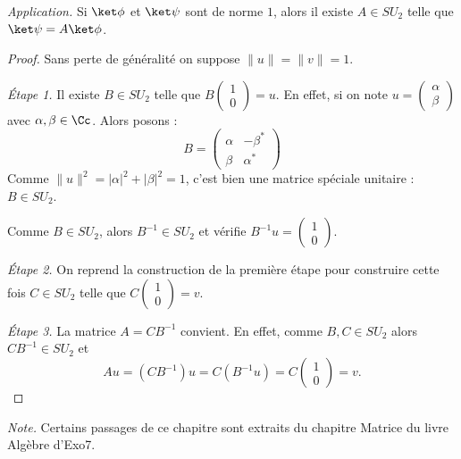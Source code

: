 \documentclass[11pt,class=report,crop=false]{standalone}
\begin{document}
\emph{Application.} Si $\ket\phi$ et $\ket\psi$ sont de norme $1$, alors il existe
$A \in SU_2$ telle que $\ket\psi = A \ket\phi$.

\begin{proof}
Sans perte de généralité on suppose $\|u\|=\|v\| = 1$.

\emph{Étape 1.} Il existe $B \in SU_2$ telle que $B \left(\begin{smallmatrix}1\\0\end{smallmatrix}\right) = u$.
En effet, si on note $u = \left(\begin{smallmatrix}\alpha\\\beta\end{smallmatrix}\right)$
avec $\alpha, \beta \in \Cc$.
Alors posons :
$$B = \begin{pmatrix}\alpha&-\beta^*\\\beta&\alpha^*\end{pmatrix}$$
Comme $\|u\|^2 = |\alpha|^2 + |\beta|^2 = 1$, c'est bien une matrice spéciale unitaire : $B\in SU_2$.

Comme $B \in SU_2$, alors $B^{-1} \in SU_2$ et vérifie $B^{-1}u = \left(\begin{smallmatrix}1\\0\end{smallmatrix}\right)$.

\emph{Étape 2.} On reprend la construction de la première étape pour construire cette fois 
$C \in SU_2$ telle que $C \left(\begin{smallmatrix}1\\0\end{smallmatrix}\right) = v$.

\emph{Étape 3.} La matrice $A = CB^{-1}$ convient.
En effet, comme $B, C \in SU_2$ alors $CB^{-1} \in SU_2$ et 
$$Au = (CB^{-1})u = C(B^{-1}u) = C\left(\begin{smallmatrix}1\\0\end{smallmatrix}\right) = v.$$
\end{proof}



\bigskip
\bigskip
 	\emph{Note.} Certains passages de ce chapitre sont extraits du chapitre \og{}Matrice\fg{} du livre \og{}Algèbre\fg{} d'Exo7.
\end{document}
